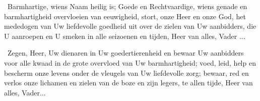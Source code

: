 \documentclass[12pt,twoside,a5paper]{article}
\begin{document}
\cc\ Barmhartige, wiens Naam heilig is; Goede en Rechtvaardige, wiens genade en barmhartigheid overvloeien van eeuwigheid, stort, onze Heer en onze God, het mededogen van Uw liefdevolle goedheid uit over de zielen van Uw aanbidders, die U aanroepen en U smeken in alle seizoenen en tijden, Heer van alles, Vader ...

\cc\ Zegen, Heer, Uw dienaren in Uw goedertierenheid en bewaar Uw aanbidders voor alle kwaad in de grote overvloed van Uw barmhartigheid; voed, leid, help en bescherm onze levens onder de vleugels van Uw liefdevolle zorg; bewaar, red en verlos onze lichamen en zielen van de boze en zijn legers, te allen tijde, Heer van alles, Vader...


\end{document}
